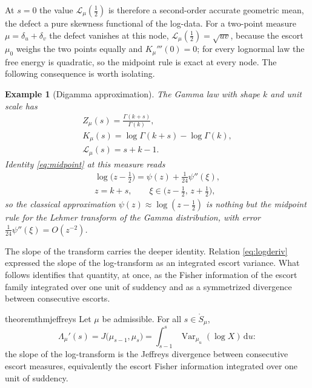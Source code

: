 \documentclass[sn-mathphys-num]{sn-jnl}
\theoremstyle{thmstyleone}%
\theoremstyle{thmstyletwo}%
\newtheorem{example}{Example}%
\theoremstyle{thmstylethree}%
\theoremstyle{thmstyleone}%
\providecommand{\Var}{\operatorname{Var}}
\providecommand{\Leh}{\mathscr{L}}
\providecommand{\dd}{\,\mathrm{d}}
\begin{document}
	
	At $s=0$ the value $\Leh_\mu(\tfrac12)$ is therefore a
	second-order accurate geometric mean, the defect a pure skewness
	functional of the log-data. For a two-point measure
	$\mu=\delta_u+\delta_v$ the defect vanishes at this node,
	$\Leh_\mu(\tfrac12)=\sqrt{uv}$, because the escort $\mu_0$
	weighs the two points equally and $K_\mu'''(0)=0$; for every
	lognormal law the free energy is quadratic, so the midpoint rule is
	exact at every node. The following consequence is worth isolating.
	
	\begin{example}[Digamma approximation]\label{ex:digamma}
		The Gamma law with shape $k$ and unit scale has
		\begin{equation}\label{eq:gammaKL}
			\begin{gathered}
				Z_\mu(s)=\frac{\Gamma(k+s)}{\Gamma(k)},\\
				K_\mu(s)=\log\Gamma(k+s)-\log\Gamma(k),\\
				\Leh_\mu(s)=s+k-1 .
			\end{gathered}
		\end{equation}
		Identity \eqref{eq:midpoint} at this measure reads
		\begin{equation}\label{eq:digamma}
			\begin{gathered}
				\log\bigl(z-\tfrac12\bigr)=\psi(z)+\tfrac1{24}\psi''(\xi),\\
				z=k+s,\qquad\xi\in\bigl(z-\tfrac12,\,z+\tfrac12\bigr),
			\end{gathered}
		\end{equation}
		so the classical approximation $\psi(z)\approx\log(z-\tfrac12)$ is
		nothing but the midpoint rule for the Lehmer transform of the
		Gamma distribution, with error
		$\tfrac1{24}\psi''(\xi)=O(z^{-2})$.
	\end{example}
	
	The slope of the transform carries the deeper identity. Relation
	\eqref{eq:logderiv} expressed the slope of the log-transform as an
	integrated escort variance. What follows identifies that quantity,
	at once, as the Fisher information of the escort family integrated
	over one unit of suddency and as a symmetrized divergence between
	consecutive escorts.
	
	\begin{restatable}{theorem}{thmjeffreys}\label{thm:jeffreys}
		Let $\mu$ be admissible. For all $s\in\mathring S_\mu$,
		\begin{equation}\label{eq:jeffreys}
			\Lambda_\mu'(s)
			=J\bigl(\mu_{s-1},\mu_s\bigr)
			=\int_{s-1}^{s}\Var_{\mu_u}(\log X)\dd u:
		\end{equation}
		the slope of the log-transform is the Jeffreys divergence between
		consecutive escort measures, equivalently the escort Fisher
		information integrated over one unit of suddency.
	\end{restatable}
	
\end{document}
